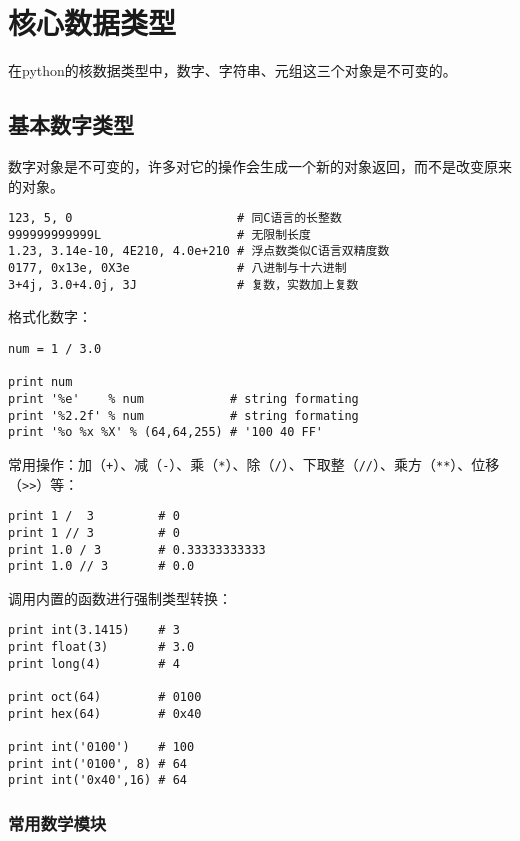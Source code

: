 
\chapter{核心数据类型}

在python的核数据类型中，数字、字符串、元组这三个对象是不可变的。

\section{基本数字类型}

数字对象是不可变的，许多对它的操作会生成一个新的对象返回，而不是改变原来的对象。

\begin{lstlisting}
123, 5, 0                       # 同C语言的长整数
999999999999L                   # 无限制长度
1.23, 3.14e-10, 4E210, 4.0e+210 # 浮点数类似C语言双精度数
0177, 0x13e, 0X3e               # 八进制与十六进制
3+4j, 3.0+4.0j, 3J              # 复数，实数加上复数
\end{lstlisting}

格式化数字：

\begin{lstlisting}
num = 1 / 3.0

print num
print '%e'    % num            # string formating
print '%2.2f' % num            # string formating
print '%o %x %X' % (64,64,255) # '100 40 FF'
\end{lstlisting}

常用操作：加（\verb|+|）、减（\verb|-|）、乘（\verb|*|）、除（\verb|/|）、下取整（\verb|//|）、乘方（\verb|**|）、位移（\verb|>>|）等：

\begin{lstlisting}
print 1 /  3         # 0
print 1 // 3         # 0
print 1.0 / 3        # 0.33333333333
print 1.0 // 3       # 0.0
\end{lstlisting}

调用内置的函数进行强制类型转换：

\begin{lstlisting}
print int(3.1415)    # 3
print float(3)       # 3.0
print long(4)        # 4

print oct(64)        # 0100
print hex(64)        # 0x40

print int('0100')    # 100
print int('0100', 8) # 64
print int('0x40',16) # 64
\end{lstlisting}

\subsection{常用数学模块}

